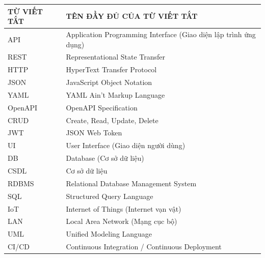 
\begin{table}[H]
\centering
\renewcommand{\arraystretch}{1.3}
\begin{tabular}{|p{4cm}|p{10cm}|}
\hline
\centering\textbf{TỪ VIẾT TẮT} &
\centering\arraybackslash\textbf{TÊN ĐẦY ĐỦ CỦA TỪ VIẾT TẮT} \\
\hline

API & Application Programming Interface (Giao diện lập trình ứng dụng) \\
\hline

REST & Representational State Transfer \\
\hline

HTTP & HyperText Transfer Protocol \\
\hline

JSON & JavaScript Object Notation \\
\hline

YAML & YAML Ain't Markup Language \\
\hline

OpenAPI & OpenAPI Specification \\
\hline

CRUD & Create, Read, Update, Delete \\
\hline

JWT & JSON Web Token \\
\hline

UI & User Interface (Giao diện người dùng) \\
\hline

DB & Database (Cơ sở dữ liệu) \\
\hline

CSDL & Cơ sở dữ liệu \\
\hline

RDBMS & Relational Database Management System \\
\hline

SQL & Structured Query Language \\
\hline

IoT & Internet of Things (Internet vạn vật) \\
\hline

LAN & Local Area Network (Mạng cục bộ) \\
\hline

UML & Unified Modeling Language \\
\hline

CI/CD & Continuous Integration / Continuous Deployment \\
\hline


\end{tabular}
\end{table}
